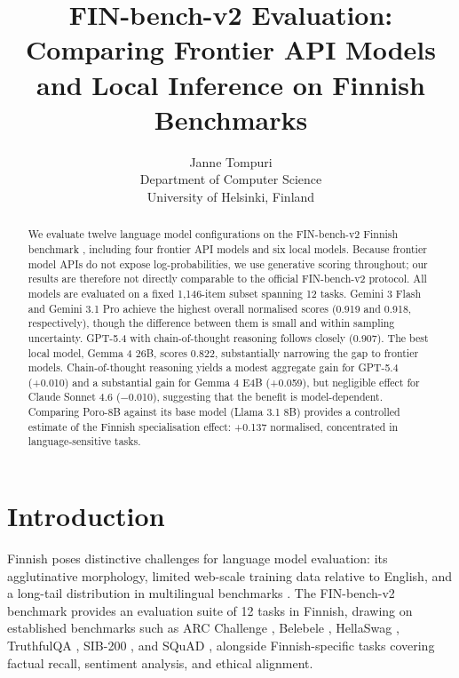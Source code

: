 \documentclass[11pt]{article}
\title{FIN-bench-v2 Evaluation: Comparing Frontier API Models\\
and Local Inference on Finnish Benchmarks}
\author{Janne Tompuri \\
  Department of Computer Science \\
  University of Helsinki, Finland \\}
\begin{document}
\maketitle

\begin{abstract}
We evaluate twelve language model configurations on the FIN-bench-v2 Finnish
benchmark \cite{kytoniemi2025}, including four frontier API models and six local models.
Because frontier model APIs do not expose log-probabilities, we use generative
scoring throughout; our results are therefore not directly comparable to the
official FIN-bench-v2 protocol.
All models are evaluated on a fixed 1{,}146-item subset spanning 12 tasks.
Gemini 3 Flash and Gemini 3.1 Pro achieve the highest overall
normalised scores (0.919 and 0.918, respectively), though the difference
between them is small and within sampling uncertainty.
GPT-5.4 with chain-of-thought reasoning follows closely (0.907).
The best local model, Gemma 4 26B, scores 0.822, substantially narrowing
the gap to frontier models.
Chain-of-thought reasoning yields a modest aggregate gain for GPT-5.4 (+0.010)
and a substantial gain for Gemma 4 E4B (+0.059), but negligible effect for
Claude Sonnet 4.6 ($-$0.010), suggesting that the benefit is model-dependent.
Comparing Poro-8B against its base model (Llama 3.1 8B) provides a
controlled estimate of the Finnish specialisation effect: +0.137 normalised,
concentrated in language-sensitive tasks.
\end{abstract}

\section{Introduction}

Finnish poses distinctive challenges for language model evaluation:
its agglutinative morphology, limited web-scale training data relative to
English, and a long-tail distribution in multilingual benchmarks
\cite{luukkonen2023fingpt,kytoniemi2025}.
The FIN-bench-v2 benchmark \cite{kytoniemi2025} provides an evaluation
suite of 12 tasks in Finnish, drawing on established benchmarks such as
ARC Challenge \cite{clark2018arc}, Belebele \cite{bandarkar2024belebele},
HellaSwag \cite{zellers2019hellaswag}, TruthfulQA \cite{lin2022truthfulqa},
SIB-200 \cite{adelani2024sib200}, and SQuAD \cite{rajpurkar2016squad},
alongside Finnish-specific tasks covering factual recall, sentiment analysis,
and ethical alignment.
\end{document}
